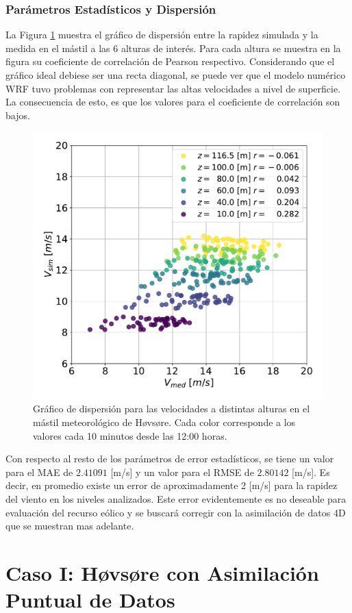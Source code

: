 \subsubsection{Parámetros Estadísticos y Dispersión}
La Figura \ref{fig:06_corr_hov} muestra el gráfico de dispersión entre la rapidez simulada y la medida en el mástil a las 6 alturas de interés. Para cada altura se muestra en la figura su coeficiente de correlación de Pearson respectivo. Considerando que el gráfico ideal debiese ser una recta diagonal, se puede ver que el modelo numérico WRF tuvo problemas con representar las altas velocidades a nivel de superficie. La consecuencia de esto, es que los valores para el coeficiente de correlación son bajos.
\begin{figure}[H]
	\centering
	\includegraphics[width=0.55\linewidth,page=1,trim={0cm 0cm 0cm 0cm},clip]{Imagenes/06/hov/corr}%
	\caption{Gráfico de dispersión para las velocidades a distintas alturas en el mástil meteorológico de Høvsøre. Cada color corresponde a los valores cada 10 minutos desde las 12:00 horas.}
	\label{fig:06_corr_hov}
\end{figure}

Con respecto al resto de los parámetros de error estadísticos, se tiene un valor para el MAE de $2.41091$ [m/s] y un valor para el RMSE de $2.80142$ [m/s]. Es decir, en promedio existe un error de aproximadamente 2 [m/s] para la rapidez del viento en los niveles analizados. Este error evidentemente es no deseable para evaluación del recurso eólico y se buscará corregir con la asimilación de datos 4D que se muestran mas adelante.













\newpage
\section{Caso I: Høvsøre con Asimilación Puntual de Datos}
